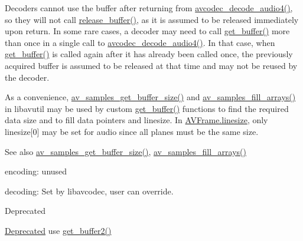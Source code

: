 Decoders cannot use the buffer after returning from \hyperlink{group__lavc__decoding_ga834bb1b062fbcc2de4cf7fb93f154a3e}{avcodec\+\_\+decode\+\_\+audio4()}, so they will not call \hyperlink{struct_a_v_codec_context_ac934a388c7779e800c13914ff00b6916}{release\+\_\+buffer()}, as it is assumed to be released immediately upon return. In some rare cases, a decoder may need to call \hyperlink{struct_a_v_codec_context_abc3a806b73306162efa218510448d54f}{get\+\_\+buffer()} more than once in a single call to \hyperlink{group__lavc__decoding_ga834bb1b062fbcc2de4cf7fb93f154a3e}{avcodec\+\_\+decode\+\_\+audio4()}. In that case, when \hyperlink{struct_a_v_codec_context_abc3a806b73306162efa218510448d54f}{get\+\_\+buffer()} is called again after it has already been called once, the previously acquired buffer is assumed to be released at that time and may not be reused by the decoder.

As a convenience, \hyperlink{samplefmt_8h_aa7368bc4e3a366b688e81938ed55eb06}{av\+\_\+samples\+\_\+get\+\_\+buffer\+\_\+size()} and \hyperlink{samplefmt_8h_a673254a62fa75dab3211caf17c73c6eb}{av\+\_\+samples\+\_\+fill\+\_\+arrays()} in libavutil may be used by custom \hyperlink{struct_a_v_codec_context_abc3a806b73306162efa218510448d54f}{get\+\_\+buffer()} functions to find the required data size and to fill data pointers and linesize. In \hyperlink{struct_a_v_frame_aa52bfc6605f6a3059a0c3226cc0f6567}{A\+V\+Frame.\+linesize}, only linesize\mbox{[}0\mbox{]} may be set for audio since all planes must be the same size.

\begin{DoxySeeAlso}{See also}
\hyperlink{samplefmt_8h_aa7368bc4e3a366b688e81938ed55eb06}{av\+\_\+samples\+\_\+get\+\_\+buffer\+\_\+size()}, \hyperlink{samplefmt_8h_a673254a62fa75dab3211caf17c73c6eb}{av\+\_\+samples\+\_\+fill\+\_\+arrays()}
\end{DoxySeeAlso}

\begin{DoxyItemize}
\item encoding\+: unused
\item decoding\+: Set by libavcodec, user can override.
\end{DoxyItemize}

\begin{DoxyRefDesc}{Deprecated}
\item[\hyperlink{deprecated__deprecated000017}{Deprecated}]use \hyperlink{struct_a_v_codec_context_aef79333a4c6abf1628c55d75ec82bede}{get\+\_\+buffer2()} \end{DoxyRefDesc}


